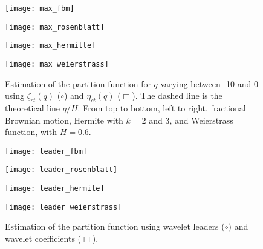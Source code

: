 \documentclass[a4paper]{article}
\begin{document}
\begin{figure}

\begin{minipage}[b]{.48\linewidth}
  \centering
  \centerline{\texttt{[image: max\_fbm]}}
  \vspace{.12cm}
\end{minipage}
\hfill
\begin{minipage}[b]{0.48\linewidth}
  \centering
  \centerline{\texttt{[image: max\_rosenblatt]}}
  \vspace{.12cm}
\end{minipage}
%
\begin{minipage}[b]{.48\linewidth}
  \centering
  \centerline{\texttt{[image: max\_hermitte]}}
  \vspace{-.12cm}
\end{minipage}
\hfill
\begin{minipage}[b]{0.48\linewidth}
  \centering
  \centerline{\texttt{[image: max\_weierstrass]}}
  \vspace{-.12cm}
\end{minipage}
%
\caption{Estimation of the partition function for $q$ varying between -10 and 0 using $\zeta_{ct}(q)$ ($\circ$) and $\eta_{ct}(q)$ ($\Box$). 
The dashed line is the theoretical line $q/H$. 
From top to bottom, left to right, fractional Brownian motion, Hermite with $k=2$ and 3, and Weierstrass function, with $H=0.6$.}
\label{fig:partition1}

\end{figure}



\begin{figure}

\begin{minipage}[b]{.48\linewidth}
  \centering
  \centerline{\texttt{[image: leader\_fbm]}}
  \vspace{.12cm}
\end{minipage}
\hfill
\begin{minipage}[b]{0.48\linewidth}
  \centering
  \centerline{\texttt{[image: leader\_rosenblatt]}}
  \vspace{.12cm}
\end{minipage}
%
\begin{minipage}[b]{.48\linewidth}
  \centering
  \centerline{\texttt{[image: leader\_hermite]}}
  \vspace{-.12cm}
\end{minipage}
\hfill
\begin{minipage}[b]{0.48\linewidth}
  \centering
  \centerline{\texttt{[image: leader\_weierstrass]}}
  \vspace{-.12cm}
\end{minipage}
%
\caption{Estimation of the partition function using wavelet leaders ($\circ$) and wavelet coefficients ($\Box$).}
\label{fig:partition2}

\end{figure}
\end{document}
